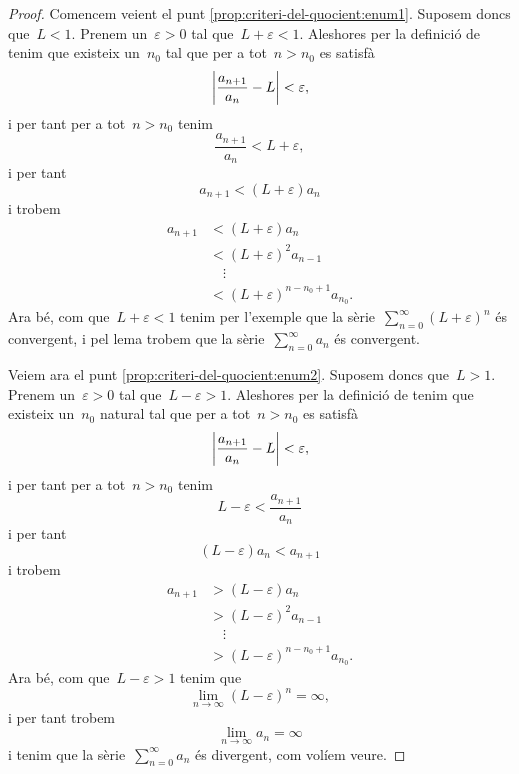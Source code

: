 \documentclass[../../main.tex]{subfiles}
\begin{document}
    \begin{proof}
        Comencem veient el punt \eqref{prop:criteri-del-quocient:enum1}.
        Suposem doncs que~\(L<1\).
        Prenem un~\(\varepsilon>0\) tal que~\(L+\varepsilon<1\).
        Aleshores per la definició de  tenim que existeix un~\(n_{0}\) tal que per a tot~\(n>n_{0}\) es satisfà
        \[
            \abs{\frac{a_{n+1}}{a_{n}}-L}<\varepsilon,
        \]
        i per tant per a tot~\(n>n_{0}\) tenim
        \[
            \frac{a_{n+1}}{a_{n}}<L+\varepsilon,
        \]
        i per tant
        \[
            a_{n+1}<(L+\varepsilon)a_{n}
        \]
        i trobem
        \begin{align*}
            a_{n+1}&<(L+\varepsilon)a_{n}\\
            &<(L+\varepsilon)^{2}a_{n-1}\\
            &\quad\vdots\\
            &<(L+\varepsilon)^{n-n_{0}+1}a_{n_{0}}.
        \end{align*}
        Ara bé, com que~\(L+\varepsilon<1\) tenim per l'exemple  que la sèrie~\(\sum_{n=0}^{\infty}(L+\varepsilon)^{n}\) és convergent, i pel lema  trobem que la sèrie~\(\sum_{n=0}^{\infty}a_{n}\) és convergent.

        Veiem ara el punt \eqref{prop:criteri-del-quocient:enum2}.
        Suposem doncs que~\(L>1\).
        Prenem un~\(\varepsilon>0\) tal que~\(L-\varepsilon>1\).
        Aleshores per la definició de  tenim que existeix un~\(n_{0}\) natural tal que per a tot~\(n>n_{0}\) es satisfà
        \[
            \abs{\frac{a_{n+1}}{a_{n}}-L}<\varepsilon,
        \]
        i per tant per a tot~\(n>n_{0}\) tenim
        \[
            L-\varepsilon<\frac{a_{n+1}}{a_{n}}
        \]
        i per tant
        \[
            (L-\varepsilon)a_{n}<a_{n+1}
        \]
        i trobem
        \begin{align*}
            a_{n+1}&>(L-\varepsilon)a_{n}\\
            &>(L-\varepsilon)^{2}a_{n-1}\\
            &\quad\vdots\\
            &>(L-\varepsilon)^{n-n_{0}+1}a_{n_{0}}.
        \end{align*}
        Ara bé, com que~\(L-\varepsilon>1\) tenim que
        \[
            \lim_{n\to\infty}(L-\varepsilon)^{n}=\infty,
        \]
        i per tant trobem
        \[
            \lim_{n\to\infty}a_{n}=\infty
        \]
        i tenim que la sèrie~\(\sum_{n=0}^{\infty}a_{n}\) és divergent, com volíem veure.
    \end{proof}
\end{document}
